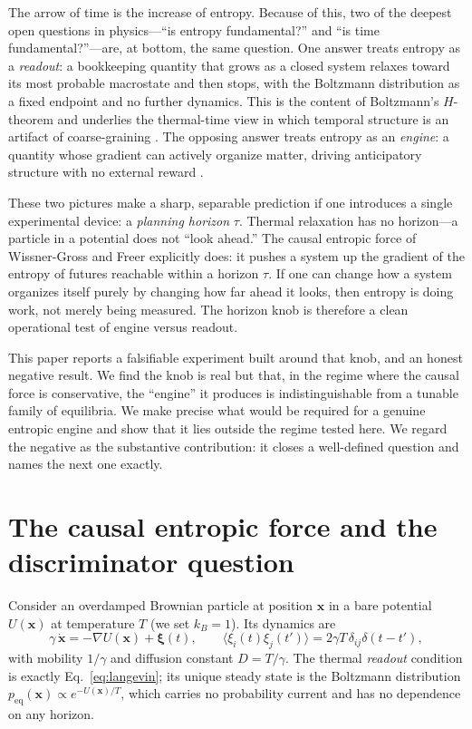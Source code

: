 \documentclass[11pt]{article}
\begin{document}
The arrow of time is the increase of entropy. Because of this, two of the deepest open questions in physics---``is entropy fundamental?'' and ``is time fundamental?''---are, at bottom, the same question. One answer treats entropy as a \emph{readout}: a bookkeeping quantity that grows as a closed system relaxes toward its most probable macrostate and then stops, with the Boltzmann distribution as a fixed endpoint and no further dynamics. This is the content of Boltzmann's $H$-theorem and underlies the thermal-time view in which temporal structure is an artifact of coarse-graining \cite{rovelli,connesrovelli,albert}. The opposing answer treats entropy as an \emph{engine}: a quantity whose gradient can actively organize matter, driving anticipatory structure with no external reward \cite{wgf,smolin}.

These two pictures make a sharp, separable prediction if one introduces a single experimental device: a \emph{planning horizon} $\tau$. Thermal relaxation has no horizon---a particle in a potential does not ``look ahead.'' The causal entropic force of Wissner-Gross and Freer \cite{wgf} explicitly does: it pushes a system up the gradient of the entropy of futures reachable within a horizon $\tau$. If one can change how a system organizes itself purely by changing how far ahead it looks, then entropy is doing work, not merely being measured. The horizon knob is therefore a clean operational test of engine versus readout.

This paper reports a falsifiable experiment built around that knob, and an honest negative result. We find the knob is real but that, in the regime where the causal force is conservative, the ``engine'' it produces is indistinguishable from a tunable family of equilibria. We make precise what would be required for a genuine entropic engine and show that it lies outside the regime tested here. We regard the negative as the substantive contribution: it closes a well-defined question and names the next one exactly.

\section{The causal entropic force and the discriminator question}

Consider an overdamped Brownian particle at position $\mathbf{x}$ in a bare potential $U(\mathbf{x})$ at temperature $T$ (we set $k_B=1$). Its dynamics are
\begin{equation}
\gamma\,\dot{\mathbf{x}} = -\nabla U(\mathbf{x}) + \boldsymbol{\xi}(t),\qquad
\langle \xi_i(t)\xi_j(t')\rangle = 2\gamma T\,\delta_{ij}\delta(t-t'),
\label{eq:langevin}
\end{equation}
with mobility $1/\gamma$ and diffusion constant $D=T/\gamma$. The thermal \emph{readout} condition is exactly Eq.~\eqref{eq:langevin}; its unique steady state is the Boltzmann distribution $p_{\text{eq}}(\mathbf{x})\propto e^{-U(\mathbf{x})/T}$, which carries no probability current and has no dependence on any horizon.
\end{document}
